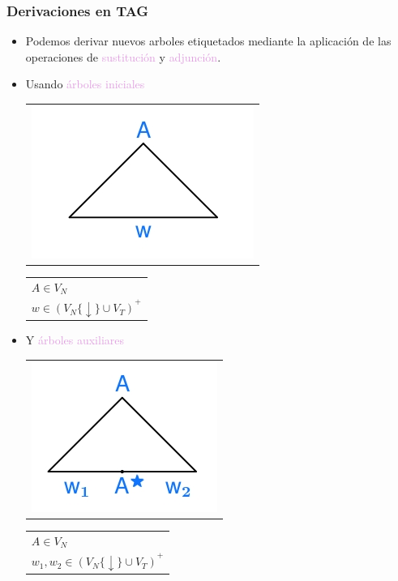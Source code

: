 \documentclass[compress,color=usenames]{beamer}
\newcommand{\mH}[1]{\textcolor{Plum}{#1}}
\begin{document}
\begin{frame}
\frametitle{Derivaciones en TAG}

\begin{itemize}
\item Podemos derivar nuevos arboles etiquetados mediante la aplicaci\'on de 
las operaciones de \mH{sustituci\'on} y \mH{adjunci\'on}.\pause

\item Usando \mH{\'arboles iniciales}

\begin{tabular}{l}
\includegraphics[scale=.5]{pics/pic2-15.jpg}
\end{tabular}
\begin{tabular}{l}
$A \in V_N$\\
$w \in (V_N \{\downarrow \} \cup V_T)^+$\pause
\end{tabular}

\item Y \mH{\'arboles auxiliares}

\begin{tabular}{l}
\includegraphics[scale=.5]{pics/pic2-16.jpg}
\end{tabular}
\begin{tabular}{l}
$A \in V_N$\\
$w_1,w_2 \in (V_N \{\downarrow \} \cup V_T)^+$
\end{tabular}

\end{itemize}
\end{frame}
\end{document}

